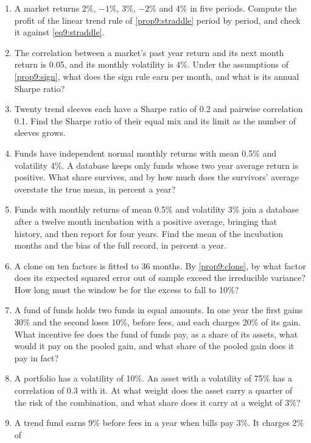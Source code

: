 \begin{chapterrefs}
\begin{enumerate}[label=\textbf{9.\arabic*}, leftmargin=*, ref=9.\arabic*]
  \item\label{exr9:one} A market returns 2\%, $-1$\%, 3\%, $-2$\% and 4\% in five periods. Compute the profit of
  the linear trend rule of \cref{prop9:straddle} period by period, and check it against
  \cref{eq9:straddle}.
  \item\label{exr9:two} The correlation between a market's past year return and its next month return
  is 0.05, and its monthly volatility is 4\%. Under the assumptions of \cref{prop9:sign}, what does the
  sign rule earn per month, and what is its annual Sharpe ratio?
  \item\label{exr9:three} Twenty trend sleeves each have a Sharpe ratio of 0.2 and pairwise correlation
  0.1. Find the Sharpe ratio of their equal mix and its limit as the number of sleeves grows.
  \item\label{exr9:four} Funds have independent normal monthly returns with mean 0.5\% and volatility 4\%.
  A database keeps only funds whose two year average return is positive. What share survives, and by
  how much does the survivors' average overstate the true mean, in percent a year?
  \item\label{exr9:five} Funds with monthly returns of mean 0.5\% and volatility 3\% join a database after
  a twelve month incubation with a positive average, bringing that history, and then report for four
  years. Find the mean of the incubation months and the bias of the full record, in percent a year.
  \item\label{exr9:six} A clone on ten factors is fitted to 36 months. By \cref{prop9:clone}, by what factor
  does its expected squared error out of sample exceed the irreducible variance? How long must the
  window be for the excess to fall to 10\%?
  \item\label{exr9:seven} A fund of funds holds two funds in equal amounts. In one year the first gains 30\%
  and the second loses 10\%, before fees, and each charges 20\% of its gain. What incentive fee does the
  fund of funds pay, as a share of its assets, what would it pay on the pooled gain, and what share of
  the pooled gain does it pay in fact?
  \item\label{exr9:eight} A portfolio has a volatility of 10\%. An asset with a volatility of 75\% has a
  correlation of 0.3 with it. At what weight does the asset carry a quarter of the risk of the
  combination, and what share does it carry at a weight of 3\%?
  \item\label{exr9:nine} A trend fund earns 9\% before fees in a year when bills pay 3\%. It charges 2\% of

\end{enumerate}
\end{chapterrefs}
